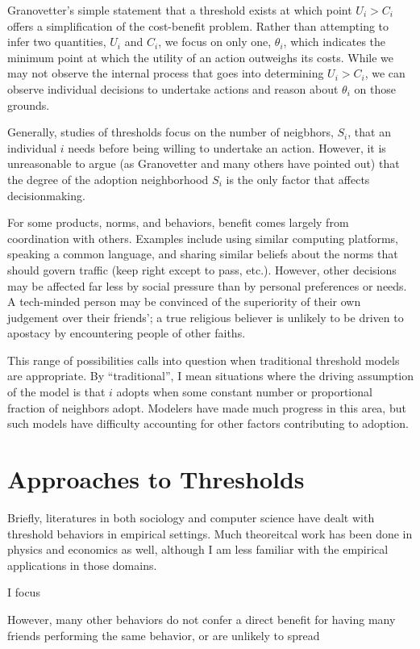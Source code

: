 \documentclass{article}
\begin{document}
Granovetter's simple statement that a threshold exists at which point $U_i > C_i$ offers a simplification of the cost-benefit problem. Rather than attempting to infer two quantities, $U_i$ and $C_i$, we focus on only one, $\theta_i$, which indicates the minimum point at which the utility of an action outweighs its costs. While we may not observe the internal process that goes into determining $U_i > C_i$, we can observe individual decisions to undertake actions and reason about $\theta_i$ on those grounds.

Generally, studies of thresholds focus on the number of neigbhors, $S_i$, that an individual $i$ needs before being willing to undertake an action. However, it is unreasonable to argue (as Granovetter and many others have pointed out) that the degree of the adoption neighborhood $S_i$ is the only factor that affects decisionmaking.

For some products, norms, and behaviors, benefit comes largely from coordination with others. Examples include using similar computing platforms, speaking a common language, and sharing similar beliefs about the norms that should govern traffic (keep right except to pass, etc.). However, other decisions may be affected far less by social pressure than by personal preferences or needs. A tech-minded person may be convinced of the superiority of their own judgement over their friends'; a true religious believer is unlikely to be driven to apostacy by encountering people of other faiths.

This range of possibilities calls into question when traditional threshold models are appropriate. By ``traditional'', I mean situations where the driving assumption of the model is that $i$ adopts when some constant number or proportional fraction of neighbors adopt. Modelers have made much progress in this area, but such models have difficulty accounting for other factors contributing to adoption.

\section{Approaches to Thresholds}

Briefly, literatures in both sociology and computer science have dealt with threshold behaviors in empirical settings. Much theoreitcal work has been done in physics and economics as well, although I am less familiar with the empirical applications in those domains.

I focus


However, many other behaviors do not confer a direct benefit for having many friends performing the same behavior, or are unlikely to spread 
\end{document}
